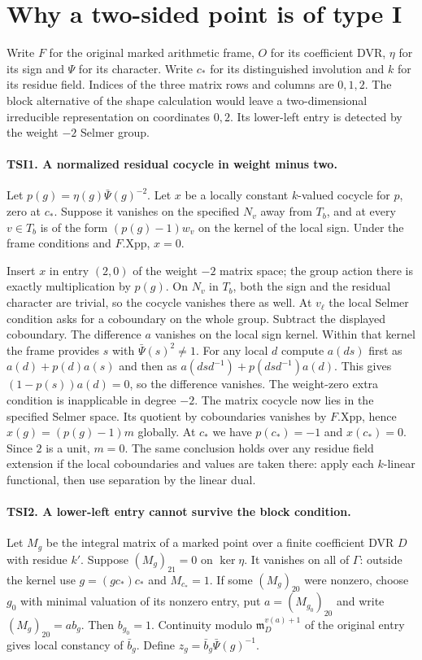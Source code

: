\section{Why a two-sided point is of type I}

Write $F$ for the original marked arithmetic frame, $O$ for its
coefficient DVR, $\eta$ for its sign and $\Psi$ for its character.
Write $c_*$ for its distinguished involution and $k$ for its residue
field. Indices of the three matrix rows and columns are $0,1,2$.
The block alternative of the shape calculation would leave a
two-dimensional irreducible representation on coordinates $0,2$.
Its lower-left entry is detected by the weight $-2$ Selmer group.

\paragraph{TSI1. A normalized residual cocycle in weight minus two.}
Let $p(g)=\eta(g)\bar\Psi(g)^{-2}$. Let $x$ be a locally constant
$k$-valued cocycle for $p$, zero at $c_*$. Suppose it vanishes on
the specified $N_v$ away from $T_b$, and at every $v\in T_b$ is
of the form $(p(g)-1)w_v$ on the kernel of the local sign.
Under the frame conditions and $F.\mathrm{Xpp}$, $x=0$.

Insert $x$ in entry $(2,0)$ of the weight $-2$ matrix space;
the group action there is exactly multiplication by $p(g)$.
On $N_v$ in $T_b$, both the sign and the residual character are
trivial, so the cocycle vanishes there as well. At $v_\ell$ the
local Selmer condition asks for a coboundary on the whole group.
Subtract the displayed coboundary. The difference $a$ vanishes on
the local sign kernel. Within that kernel the frame provides $s$
with $\bar\Psi(s)^2\ne1$. For any local $d$ compute $a(ds)$ first
as $a(d)+p(d)a(s)$ and then as
$a(dsd^{-1})+p(dsd^{-1})a(d)$. This gives
$(1-p(s))a(d)=0$, so the difference vanishes. The weight-zero
extra condition is inapplicable in degree $-2$. The matrix cocycle
now lies in the specified Selmer space. Its quotient by coboundaries
vanishes by $F.\mathrm{Xpp}$, hence $x(g)=(p(g)-1)m$ globally.
At $c_*$ we have $p(c_*)=-1$ and $x(c_*)=0$. Since $2$ is a unit,
$m=0$. The same conclusion holds over any residue field extension
if the local coboundaries and values are taken there: apply each
$k$-linear functional, then use separation by the linear dual.

\paragraph{TSI2. A lower-left entry cannot survive the block condition.}
Let $M_g$ be the integral matrix of a marked point over a finite
coefficient DVR $D$ with residue $k'$. Suppose $(M_g)_{21}=0$
on $\ker\eta$. It vanishes on all of $\Gamma$: outside the kernel
use $g=(gc_*)c_*$ and $M_{c_*}=1$. If some $(M_g)_{20}$ were nonzero,
choose $g_0$ with minimal valuation of its nonzero entry, put
$a=(M_{g_0})_{20}$ and write $(M_g)_{20}=a b_g$. Then $b_{g_0}=1$.
Continuity modulo $\mathfrak m_D^{v(a)+1}$ of the original entry
gives local constancy of $\bar b_g$. Define $z_g=\bar b_g\bar\Psi(g)^{-1}$.

